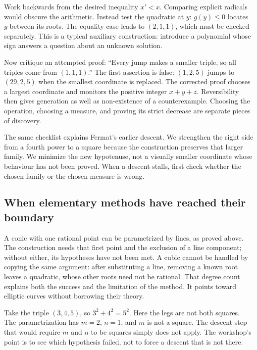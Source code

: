 Work backwards from the desired inequality $x'<x$. Comparing explicit
radicals would obscure the arithmetic. Instead test the quadratic at $y$:
$g(y)\le0$ locates $y$ between its roots. The equality case leads to
$(2,1,1)$, which must be checked separately. This is a typical auxiliary
construction: introduce a polynomial whose sign answers a question about
an unknown solution.

Now critique an attempted proof: ``Every jump makes a smaller triple, so
all triples come from $(1,1,1)$.'' The first assertion is false:
$(1,2,5)$ jumps to $(29,2,5)$ when the smallest coordinate is replaced.
The corrected proof chooses a largest coordinate and monitors the positive
integer $x+y+z$. Reversibility then gives generation as well as non-existence
of a counterexample. Choosing the operation, choosing a measure, and
proving its strict decrease are separate pieces of discovery.

The same checklist explains Fermat's earlier descent. We strengthen the
right side from a fourth power to a square because the construction preserves
that larger family. We minimize the new hypotenuse, not a visually smaller
coordinate whose behaviour has not been proved. When a descent stalls,
first check whether the chosen family or the chosen measure is wrong.

\subsection*{When elementary methods have reached their boundary}
A conic with one rational point can be parametrized by lines, as proved
above. The construction needs that first point and the exclusion of a line
component; without either, its hypotheses have not been met. A cubic cannot
be handled by copying the same argument: after substituting a line, removing
a known root leaves a quadratic, whose other roots need not be rational.
That degree count explains both the success and the limitation of the method.
It points toward elliptic curves without borrowing their theory.

\begin{examplex}
Take the triple $(3,4,5)$, so $3^2+4^2=5^2$. Here the legs are not both squares. The parametrization has $m=2$, $n=1$, and $m$ is not a square. The descent step that would require $m$ and $n$ to be squares simply does not apply. The workshop's point is to see which hypothesis failed, not to force a descent that is not there.
\end{examplex}

